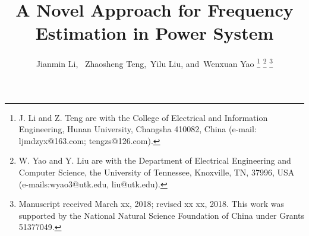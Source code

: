 \documentclass[journal,twoside]{IEEEtran}
\begin{document}
%
\title{A Novel Approach for Frequency Estimation in Power System}
%
%
%
\author{Jianmin  Li,~
		Zhaosheng Teng,~Yilu Liu,
		and~Wenxuan Yao%
		\thanks{J.  Li and Z. Teng are with the College of Electrical and Information Engineering, Hunan University, Changsha 410082, China (e-mail: ljmdzyx@163.com; tengzs@126.com).} %
		\thanks{W. Yao and Y. Liu are with the Department of Electrical Engineering and Computer Science, the University of Tennessee, Knoxville, TN, 37996, USA (e-mails:wyao3@utk.edu, liu@utk.edu).}
		\thanks{Manuscript received March xx, 2018; revised xx xx, 2018. This work was supported by the National Natural Science Foundation of China under Grants 51377049.}}%

% 
%
\end{document}
